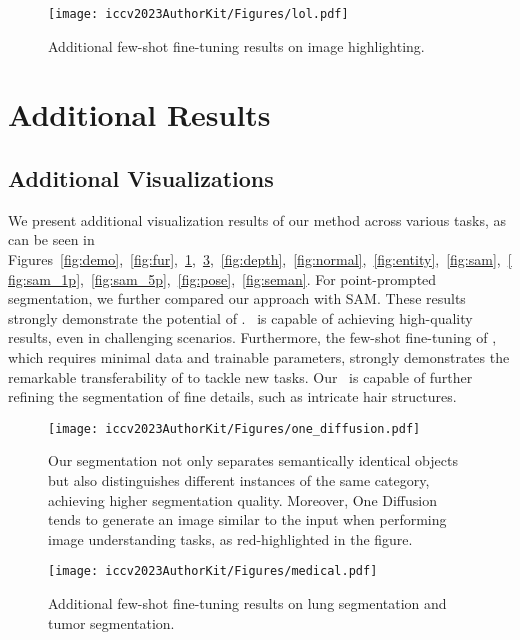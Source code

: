 \begin{figure}[h!]
  \centering
  \texttt{[image: iccv2023AuthorKit/Figures/lol.pdf]}
  \caption{
   Additional few-shot fine-tuning results on image highlighting.
  }
  \label{fig:lol}
\end{figure}



\section{Additional Results}
\label{appendix:additional_results}
\subsection{Additional Visualizations}
We present additional visualization results of our method across various tasks, as can be seen in Figures~\ref{fig:demo},~\ref{fig:fur},~\ref{fig:lol},~\ref{fig:medical},~\ref{fig:depth},~\ref{fig:normal},~\ref{fig:entity},~\ref{fig:sam},~\ref{fig:sam_1p},~\ref{fig:sam_5p},~\ref{fig:pose},~\ref{fig:seman}. For point-prompted segmentation, we further compared our approach with SAM. These results strongly demonstrate the potential of \ours. \ours\ is capable of achieving high-quality results, even in challenging scenarios. Furthermore, the few-shot fine-tuning of \ours, which requires minimal data and trainable parameters, strongly demonstrates the remarkable transferability of \ours to tackle new tasks. Our \ours\ is capable of further refining the segmentation of fine details, such as intricate hair structures.

\begin{figure}[htbp]
  \centering
  \texttt{[image: iccv2023AuthorKit/Figures/one\_diffusion.pdf]}
  \caption{
   Our segmentation not only separates semantically identical objects but also distinguishes different instances of the same category, achieving higher segmentation quality. Moreover, One Diffusion tends to generate an image similar to the input when performing image understanding tasks, as red-highlighted in the figure.
  }
  \label{fig:one_diffusion}
\end{figure}

\begin{figure}[htbp]
  \centering
  \texttt{[image: iccv2023AuthorKit/Figures/medical.pdf]}
  \caption{
   Additional few-shot fine-tuning results on lung segmentation and tumor segmentation.
  }
  \label{fig:medical}
\end{figure}


